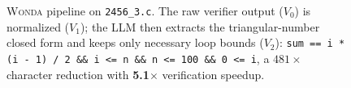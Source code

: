 \documentclass[10pt]{article}
\begin{document}
\begin{figure}[ht!]
\begin{tikzpicture}
\end{tikzpicture}
\caption{\textsc{Wonda} pipeline on \texttt{2456\_3.c}. The raw verifier output ($V_0$) is normalized ($V_1$); the LLM then extracts the triangular-number closed form and keeps only necessary loop bounds ($V_2$): \texttt{sum == i * (i - 1) / 2 \&\& i <= n \&\& n <= 100 \&\& 0 <= i}, a $481\times$ character reduction with \textbf{5.1$\times$} verification speedup.}
\label{fig:pipeline_showcase_2456_3_c}
\end{figure}
\end{document}
